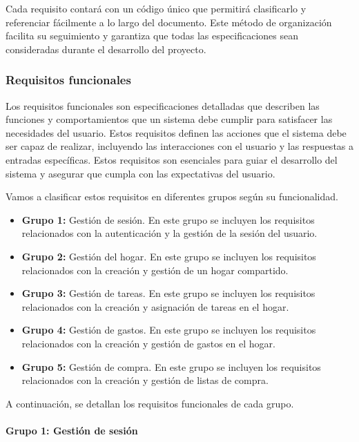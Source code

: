 Cada requisito contará con un código único que permitirá clasificarlo y referenciar fácilmente a lo largo del documento. Este método de organización facilita su seguimiento y garantiza que 
todas las especificaciones sean consideradas durante el desarrollo del proyecto. 

\subsubsection{Requisitos funcionales}
\label{subsec:requisitos_funcionales}
Los requisitos funcionales son especificaciones detalladas que describen las funciones y comportamientos que un sistema debe cumplir para 
satisfacer las necesidades del usuario. Estos requisitos definen las acciones que el sistema debe ser capaz de realizar, incluyendo las interacciones
con el usuario y las respuestas a entradas específicas. Estos requisitos son esenciales para guiar el desarrollo del sistema y asegurar que cumpla con las expectativas del usuario. \cite{pmo2017}

Vamos a clasificar estos requisitos en diferentes grupos según su funcionalidad. 

\begin{itemize}
    \item \textbf{Grupo 1:} Gestión de sesión. En este grupo se incluyen los requisitos relacionados con la autenticación y la gestión de la sesión del usuario.
    \item \textbf{Grupo 2:} Gestión del hogar. En este grupo se incluyen los requisitos relacionados con la creación y gestión de un hogar compartido.
    \item \textbf{Grupo 3:} Gestión de tareas. En este grupo se incluyen los requisitos relacionados con la creación y asignación de tareas en el hogar.
    \item \textbf{Grupo 4:} Gestión de gastos. En este grupo se incluyen los requisitos relacionados con la creación y gestión de gastos en el hogar.
    \item \textbf{Grupo 5:} Gestión de compra. En este grupo se incluyen los requisitos relacionados con la creación y gestión de listas de compra.
\end{itemize}

A continuación, se detallan los requisitos funcionales de cada grupo.



\paragraph{Grupo 1: Gestión de sesión}
\label{subsubsec:grupo1}

